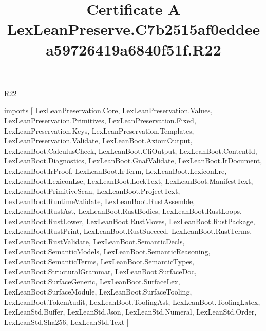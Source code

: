 \begin{lexlean}{R22}
\title{Certificate A LexLeanPreserve.C7b2515af0eddeea59726419a6840f51f.R22}
\begin{coremodule}
imports [
  LexLeanPreservation.Core,
  LexLeanPreservation.Values,
  LexLeanPreservation.Primitives,
  LexLeanPreservation.Fixed,
  LexLeanPreservation.Keys,
  LexLeanPreservation.Templates,
  LexLeanPreservation.Validate,
  LexLeanBoot.AxiomOutput,
  LexLeanBoot.CalculusCheck,
  LexLeanBoot.CliOutput,
  LexLeanBoot.ContentId,
  LexLeanBoot.Diagnostics,
  LexLeanBoot.GnafValidate,
  LexLeanBoot.IrDocument,
  LexLeanBoot.IrProof,
  LexLeanBoot.IrTerm,
  LexLeanBoot.LexiconLre,
  LexLeanBoot.LexiconLse,
  LexLeanBoot.LockText,
  LexLeanBoot.ManifestText,
  LexLeanBoot.PrimitiveScan,
  LexLeanBoot.ProjectText,
  LexLeanBoot.RuntimeValidate,
  LexLeanBoot.RustAssemble,
  LexLeanBoot.RustAst,
  LexLeanBoot.RustBodies,
  LexLeanBoot.RustLoops,
  LexLeanBoot.RustLower,
  LexLeanBoot.RustMoves,
  LexLeanBoot.RustPackage,
  LexLeanBoot.RustPrint,
  LexLeanBoot.RustSucceed,
  LexLeanBoot.RustTerms,
  LexLeanBoot.RustValidate,
  LexLeanBoot.SemanticDecls,
  LexLeanBoot.SemanticModels,
  LexLeanBoot.SemanticReasoning,
  LexLeanBoot.SemanticTerms,
  LexLeanBoot.SemanticTypes,
  LexLeanBoot.StructuralGrammar,
  LexLeanBoot.SurfaceDoc,
  LexLeanBoot.SurfaceGeneric,
  LexLeanBoot.SurfaceLex,
  LexLeanBoot.SurfaceModule,
  LexLeanBoot.SurfaceTooling,
  LexLeanBoot.TokenAudit,
  LexLeanBoot.ToolingAst,
  LexLeanBoot.ToolingLatex,
  LexLeanStd.Buffer,
  LexLeanStd.Json,
  LexLeanStd.Numeral,
  LexLeanStd.Order,
  LexLeanStd.Sha256,
  LexLeanStd.Text
]


\end{coremodule}
\end{lexlean}
